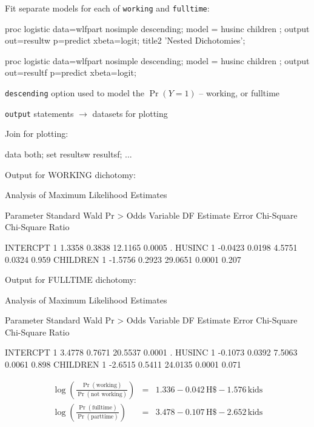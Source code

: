 \begin{frame}[fragile]
Fit separate models for each of \texttt{working} and \texttt{fulltime}:
\begin{Input}
proc logistic data=wlfpart nosimple descending;
   model  = husinc children ;
   output out=resultw p=predict xbeta=logit;
   title2 'Nested Dichotomies';

proc logistic data=wlfpart nosimple descending;
   model  = husinc children ;
   output out=resultf p=predict xbeta=logit;
\end{Input}
\begin{itemize*}
  \item \texttt{descending} option used to model the $\Pr (Y=1)$ -- working, or fulltime
  \item \texttt{output} statements $\rightarrow$ datasets for plotting
  \item Join for plotting:
\end{itemize*}
\begin{Input}[numbers=none]
data both;
   set resultsw resultsf;
   ...
\end{Input}
  
\end{frame}

\begin{frame}[fragile]
Output for WORKING dichotomy:
\begin{Output}[gobble=3,fontsize=\footnotesize,baselinestretch=0.8]
                    Analysis of Maximum Likelihood Estimates

               Parameter Standard    Wald       Pr >        Odds
   Variable DF  Estimate   Error  Chi-Square Chi-Square    Ratio

   INTERCPT 1     1.3358   0.3838    12.1165     0.0005     .
   HUSINC   1    -0.0423   0.0198     4.5751     0.0324    0.959
   CHILDREN 1    -1.5756   0.2923    29.0651     0.0001    0.207
\end{Output}

Output for FULLTIME dichotomy:
\begin{Output}[gobble=3,fontsize=\footnotesize,baselinestretch=0.8]
                    Analysis of Maximum Likelihood Estimates

               Parameter Standard    Wald       Pr >        Odds
   Variable DF  Estimate   Error  Chi-Square Chi-Square    Ratio

   INTERCPT 1     3.4778   0.7671    20.5537     0.0001     .
   HUSINC   1    -0.1073   0.0392     7.5063     0.0061    0.898
   CHILDREN 1    -2.6515   0.5411    24.0135     0.0001    0.071
\end{Output}
\begin{eqnarray*}
  \log \left( \frac{ \Pr ( \mbox{working} ) }
  { \Pr ( \mbox{not working} ) } \right) & = &
  1.336 - 0.042 \,  \mbox{H\$} - 1.576 \,  \mbox{kids} \\  %
%
  \log \left( \frac{ \Pr ( \mbox{fulltime} ) }
  { \Pr ( \mbox{parttime} ) } \right) & = &
  3.478 - 0.107 \,  \mbox{H\$} - 2.652 \,  \mbox{kids}  %
\end{eqnarray*}

\end{frame}

